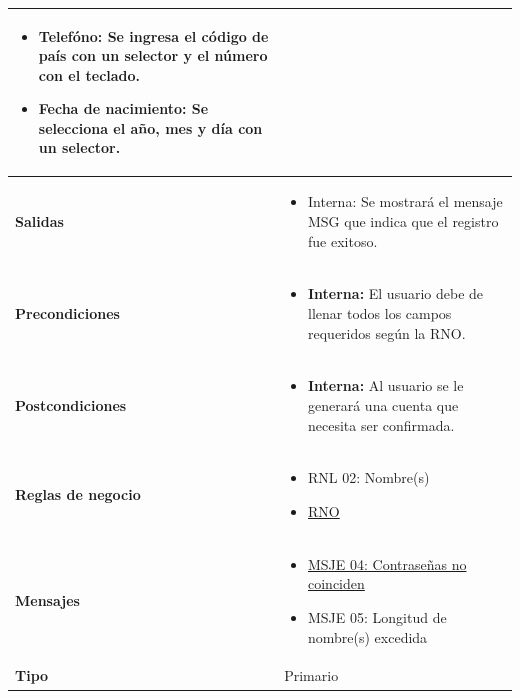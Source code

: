 \begin{center}
\begin{longtable}{| p{3.5cm} | p{11.5cm} |}
\begin{itemize}
              \item \textbf{Telefóno}: Se ingresa el código de país con un selector y el número con el teclado.
              \item \textbf{Fecha de nacimiento}: Se selecciona el año, mes y día con un selector.
            \end{itemize} \\
        \hline	
          \textbf{Salidas} &  
          \begin{itemize}
              \item Interna: Se mostrará el mensaje MSG que indica que el registro fue exitoso.
            \end{itemize} \\
        \hline	
          \textbf{Precondiciones}& 
            \begin{itemize}
              \item \textbf{Interna:} El usuario debe de llenar todos los campos requeridos según la RNO.
            \end{itemize} \\
        \hline	
          \textbf{Postcondiciones} & 
            \begin{itemize}
              \item \textbf{Interna:} Al usuario se le generará una cuenta que necesita ser confirmada.
            \end{itemize} \\
        \hline    
           \textbf{Reglas de negocio} & 
             \begin{itemize}
               \item RNL 02: Nombre(s) 
               \item\hyperref[]{RNO}
             \end{itemize} \\
        \hline
           \textbf{Mensajes} & 
              \begin{itemize}
                 \item \hyperref[msje_04]{MSJE 04: Contraseñas no coinciden}
                 \item  MSJE 05: Longitud de nombre(s) excedida
              \end{itemize}\\
        \hline
           \textbf{Tipo} & Primario \\
        \hline	    
  \end{longtable}
\end{center}
\endgroup

